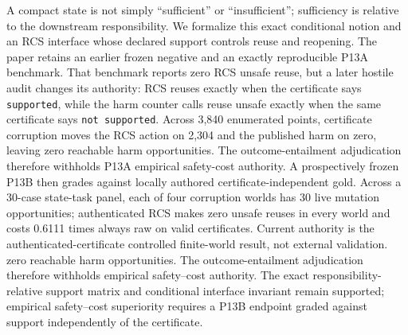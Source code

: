 A compact state is not simply ``sufficient'' or ``insufficient'';
sufficiency is relative to the downstream responsibility. We formalize
this exact conditional notion and an RCS interface whose declared
support controls reuse and reopening. The paper retains an earlier
frozen negative and an exactly reproducible P13A benchmark. That
benchmark reports zero RCS unsafe reuse, but a later hostile audit
changes its authority: RCS reuses exactly when the certificate says
\texttt{supported}, while the harm counter calls reuse unsafe exactly
when the same certificate says \texttt{not\ supported}. Across 3,840
enumerated points, certificate corruption moves the RCS action on 2,304
and the published harm on zero, leaving zero reachable harm
opportunities. The outcome-entailment adjudication therefore withholds
P13A empirical safety-cost authority. A prospectively frozen P13B then
grades against locally authored certificate-independent gold. Across a
30-case state-task panel, each of four corruption worlds has 30 live
mutation opportunities; authenticated RCS makes zero unsafe reuses in
every world and costs 0.6111 times always raw on valid certificates.
Current authority is the authenticated-certificate controlled
finite-world result, not external validation. zero reachable harm
opportunities. The outcome-entailment adjudication therefore withholds
empirical safety--cost authority. The exact responsibility-relative
support matrix and conditional interface invariant remain supported;
empirical safety--cost superiority requires a P13B endpoint graded
against support independently of the certificate.
